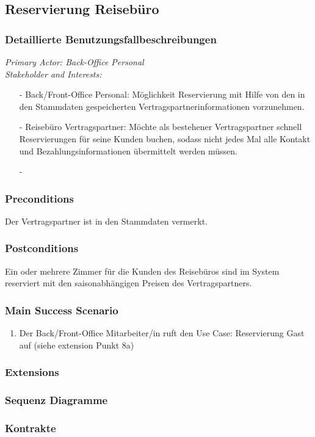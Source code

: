 \documentclass[./detailed_overview_usecases.tex]{subfiles}
\begin{document}
    \subsection{Reservierung Reisebüro}
    \subsubsection{Detaillierte Benutzungsfallbeschreibungen}

    \textit{Primary Actor: Back-Office Personal}
    \\
    \textit{Stakeholder and Interests:}
    \begin{itemize}
        \item[-] Back/Front-Office Personal: Möglichkeit Reservierung mit Hilfe von den in den Stammdaten gespeicherten Vertragspartnerinformationen vorzunehmen.
        \item[-] Reisebüro Vertragspartner: Möchte als bestehener Vertragspartner schnell Reservierungen für seine Kunden buchen, sodass nicht jedes
        Mal alle Kontakt und Bezahlungsinformationen übermittelt werden müssen.
        \item[-]
    \end{itemize}

    \subsubsection*{Preconditions}
    Der Vertragspartner ist in den Stammdaten vermerkt.

    \subsubsection*{Postconditions}
    Ein oder mehrere Zimmer für die Kunden des Reisebüros sind im System reserviert mit den saisonabhängigen Preisen des Vertragspartners.

    \subsubsection*{Main Success Scenario}
    \begin{enumerate}
        \item Der Back/Front-Office Mitarbeiter/in ruft den Use Case: Reservierung Gast auf (siehe extension Punkt 8a)
    \end{enumerate}

    \subsubsection*{Extensions}
    \item

    \subsubsection{Sequenz Diagramme}
    \subsubsection{Kontrakte}
\end{document}
